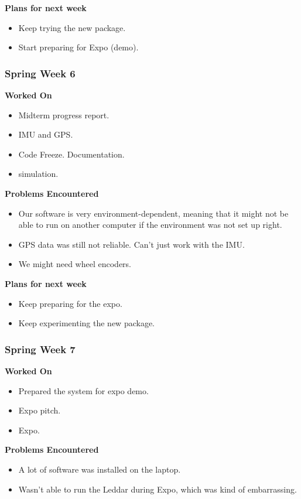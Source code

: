 \documentclass[compsoc,draftclsnofoot,onecolumn,10pt]{IEEEtran}
\begin{document}
\textbf{Plans for next week}
\begin{itemize}
  \item Keep trying the new package.
  \item Start preparing for Expo (demo).
\end{itemize}


\subsubsection*{Spring Week 6}

\textbf{Worked On}
\begin{itemize}
  \item Midterm progress report.
  \item IMU and GPS.
  \item Code Freeze. Documentation.
  \item simulation.
\end{itemize}

\textbf{Problems Encountered}
\begin{itemize}
  \item Our software is very environment-dependent, meaning that it might not
  be able to run on another computer if the environment was not set up right.
  \item GPS data was still not reliable. Can't just work with the IMU.
  \item We might need wheel encoders.
\end{itemize}

\textbf{Plans for next week}
\begin{itemize}
  \item Keep preparing for the expo.
  \item Keep experimenting the new package.
\end{itemize}


\subsubsection*{Spring Week 7}

\textbf{Worked On}
\begin{itemize}
  \item Prepared the system for expo demo.
  \item Expo pitch.
  \item Expo.
\end{itemize}

\textbf{Problems Encountered}
\begin{itemize}
  \item A lot of software was installed on the laptop.
  \item Wasn't able to run the Leddar during Expo, which was kind
  of embarrassing.
\end{itemize}
\end{document}
